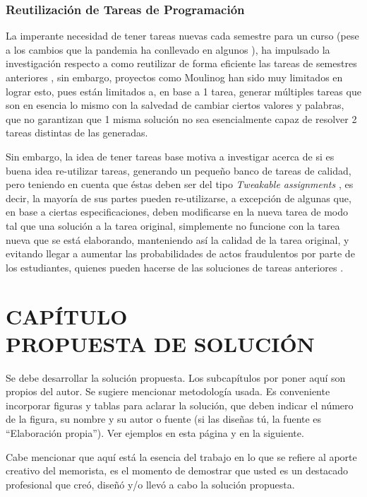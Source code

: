 \documentclass[letterpaper,12pt]{article}
\newcommand{\secnumbersection}[1]{
\addtocounter{section}{1}
\section*{CAPÍTULO \thesection \texorpdfstring{\\}\ #1}
\addcontentsline{toc}{section}{CAPÍTULO \thesection : #1}
\setcounter{subsection}{0}
}
\begin{document}
\subsubsection{Reutilización de Tareas de Programación}

La imperante necesidad de tener tareas nuevas cada semestre para un curso (pese a los cambios que la pandemia ha conllevado en algunos \cite{10.1145/3456565.3461439}), ha impulsado la investigación respecto a como reutilizar de forma eficiente las tareas de semestres anteriores \cite{10.1145/3477429}, sin embargo, proyectos como Moulinog \cite{10.1145/3414080.3414100} han sido muy limitados en lograr esto, pues están limitados a, en base a 1 tarea, generar múltiples tareas que son en esencia lo mismo con la salvedad de cambiar ciertos valores y palabras, que no garantizan que 1 misma solución no sea esencialmente capaz de resolver 2 tareas distintas de las generadas.

Sin embargo, la idea de tener tareas base motiva a investigar acerca de si es buena idea re-utilizar tareas, generando un pequeño banco de tareas de calidad, pero teniendo en cuenta que éstas deben ser del tipo \textit{Tweakable assignments} \cite{10.1145/3477429}, es decir, la mayoría de sus partes pueden re-utilizarse, a excepción de algunas que, en base a ciertas especificaciones, deben modificarse en la nueva tarea de modo tal que una solución a la tarea original, simplemente no funcione con la tarea nueva que se está elaborando, manteniendo así la calidad de la tarea original, y evitando llegar a aumentar las probabilidades de actos fraudulentos por parte de los estudiantes, quienes pueden hacerse de las soluciones de tareas anteriores \cite{10.1145/3013499.3013507}.

\newpage

\secnumbersection{PROPUESTA DE SOLUCIÓN}

Se debe desarrollar la solución propuesta. Los subcapítulos por poner aquí son propios del autor. Se sugiere mencionar metodología usada. Es conveniente incorporar figuras y tablas para aclarar la solución, que deben indicar el número de la figura, su nombre y su autor o fuente (si las diseñas tú, la fuente es ``Elaboración propia''). Ver ejemplos en esta página y en la siguiente.

Cabe mencionar que aquí está la esencia del trabajo en lo que se refiere al aporte creativo del memorista, es el momento de demostrar que usted es un destacado profesional que creó, diseñó y/o llevó a cabo la solución propuesta.
\end{document}

